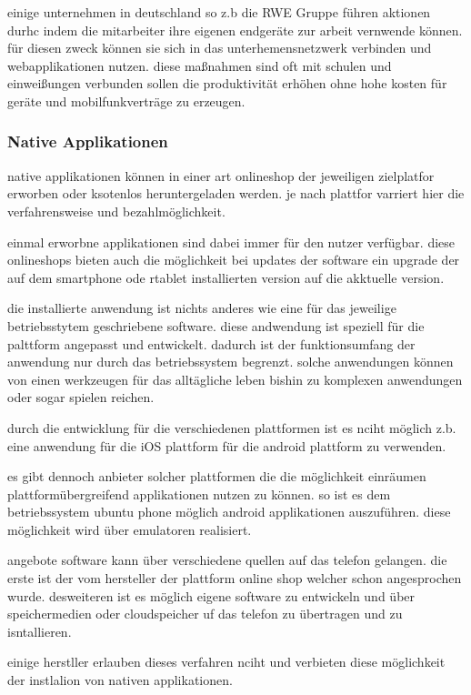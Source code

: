 einige unternehmen in deutschland so z.b die RWE Gruppe führen aktionen durhc indem die mitarbeiter ihre eigenen endgeräte zur arbeit vernwende können. für diesen zweck können sie sich in das unterhemensnetzwerk verbinden und webapplikationen nutzen. diese maßnahmen sind oft mit schulen und einweißungen verbunden sollen die produktivität erhöhen ohne hohe kosten für geräte und mobilfunkverträge zu erzeugen.

\subsubsection{Native Applikationen}

native applikationen können in einer art onlineshop der jeweiligen zielplatfor erworben oder ksotenlos heruntergeladen werden. je nach plattfor varriert hier die verfahrensweise und bezahlmöglichkeit.

einmal erworbne applikationen sind dabei immer für den nutzer verfügbar. diese onlineshops bieten auch die möglichkeit bei updates der software ein upgrade der auf dem smartphone ode rtablet installierten version auf die akktuelle version.

die installierte anwendung ist nichts anderes wie eine für das jeweilige betriebsstytem geschriebene software. diese andwendung ist speziell für die palttform angepasst und entwickelt. dadurch ist der funktionsumfang der anwendung nur durch das betriebssystem begrenzt. solche anwendungen können von einen werkzeugen für das alltägliche leben bishin zu komplexen anwendungen oder sogar spielen reichen.

durch die entwicklung für die verschiedenen plattformen ist es nciht möglich z.b. eine anwendung für die iOS plattform für die android plattform zu verwenden.

es gibt dennoch anbieter solcher plattformen die die möglichkeit einräumen plattformübergreifend applikationen nutzen zu können. so ist es dem betriebssystem ubuntu phone möglich android applikationen auszuführen. diese möglichkeit wird über emulatoren realisiert. 

angebote software kann über verschiedene quellen auf das telefon gelangen. die erste ist der vom hersteller der plattform online shop welcher schon angesprochen wurde. desweiteren ist es möglich eigene software zu entwickeln und über speichermedien oder cloudspeicher uf das telefon zu übertragen und zu isntallieren.

einige herstller erlauben dieses verfahren nciht und verbieten diese möglichkeit der instlalion von nativen applikationen.


